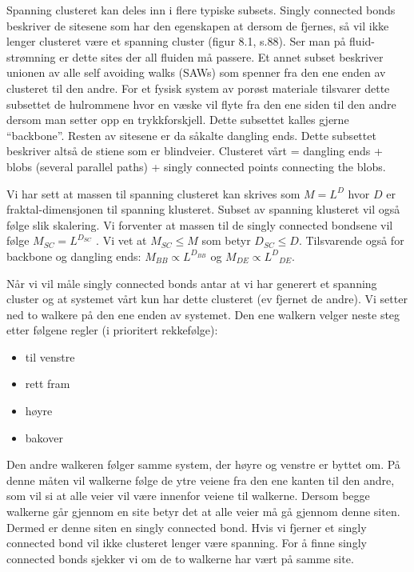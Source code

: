 \documentclass[a4paper,10pt]{article}
\begin{document}
Spanning clusteret kan deles inn i flere typiske subsets. Singly connected bonds beskriver de sitesene som har den egenskapen at dersom de fjernes, så vil ikke lenger clusteret være et spanning cluster (figur 8.1, s.88). Ser man på fluid-strømning er dette sites der all fluiden må passere. Et annet subset beskriver unionen av alle self avoiding walks (SAWs) som spenner fra den ene enden av clusteret til den andre. For et fysisk system av porøst materiale tilsvarer dette subsettet de hulrommene hvor en væske vil flyte fra den ene siden til den andre dersom man setter opp en trykkforskjell. Dette subsettet kalles gjerne ``backbone''. Resten av sitesene er da såkalte dangling ends. Dette subsettet beskriver altså de stiene som er blindveier. Clusteret vårt = dangling ends + blobs (several parallel paths) + singly connected points connecting the blobs.

Vi har sett at massen til spanning clusteret kan skrives som $M = L^D$ hvor $D$ er fraktal-dimensjonen til spanning klusteret. Subset av spanning klusteret vil også følge slik skalering. Vi forventer at massen til de singly connected bondsene vil følge $M_{SC} = L^{D_{SC}}$ . Vi vet at $M_{SC} \leq M$ som betyr $D_{SC}\leq D$. Tilsvarende også for backbone og dangling ends: $M_{BB} \propto L^{D_{BB}}$ og $M_{DE} \propto L^D{_{DE}}$.

Når vi vil måle singly connected bonds antar at vi har generert et spanning cluster og at systemet vårt kun har dette clusteret (ev fjernet de andre). Vi setter ned to walkere på den ene enden av systemet. Den ene walkern velger neste steg etter følgene regler (i prioritert rekkefølge):

\begin{itemize}
 \item til venstre
 \item rett fram
 \item høyre
 \item bakover
\end{itemize}

Den andre walkeren følger samme system, der høyre og venstre er byttet om. På denne måten vil walkerne følge de ytre veiene fra den ene kanten til den andre, som vil si at alle veier vil være innenfor veiene til walkerne. Dersom begge walkerne går gjennom en site betyr det at alle veier må gå gjennom denne siten.  Dermed er denne siten en singly connected bond. Hvis vi fjerner et singly connected bond vil ikke clusteret lenger være spanning. For å finne singly connected bonds sjekker vi om de to walkerne har vært på samme site.
\end{document}
